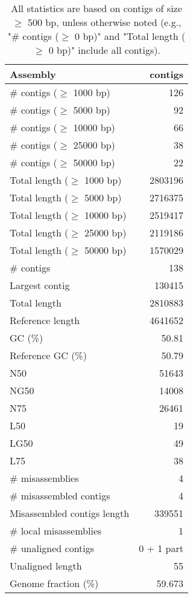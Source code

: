 \documentclass[12pt,a4paper]{article}
\begin{document}
\begin{table}[ht]
\begin{center}
\caption{All statistics are based on contigs of size $\geq$ 500 bp, unless otherwise noted (e.g., "\# contigs ($\geq$ 0 bp)" and "Total length ($\geq$ 0 bp)" include all contigs).}
\begin{tabular}{|l*{1}{|r}|}
\hline
Assembly & contigs \\ \hline
\# contigs ($\geq$ 1000 bp) & 126 \\ \hline
\# contigs ($\geq$ 5000 bp) & 92 \\ \hline
\# contigs ($\geq$ 10000 bp) & 66 \\ \hline
\# contigs ($\geq$ 25000 bp) & 38 \\ \hline
\# contigs ($\geq$ 50000 bp) & 22 \\ \hline
Total length ($\geq$ 1000 bp) & 2803196 \\ \hline
Total length ($\geq$ 5000 bp) & 2716375 \\ \hline
Total length ($\geq$ 10000 bp) & 2519417 \\ \hline
Total length ($\geq$ 25000 bp) & 2119186 \\ \hline
Total length ($\geq$ 50000 bp) & 1570029 \\ \hline
\# contigs & 138 \\ \hline
Largest contig & 130415 \\ \hline
Total length & 2810883 \\ \hline
Reference length & 4641652 \\ \hline
GC (\%) & 50.81 \\ \hline
Reference GC (\%) & 50.79 \\ \hline
N50 & 51643 \\ \hline
NG50 & 14008 \\ \hline
N75 & 26461 \\ \hline
L50 & 19 \\ \hline
LG50 & 49 \\ \hline
L75 & 38 \\ \hline
\# misassemblies & 4 \\ \hline
\# misassembled contigs & 4 \\ \hline
Misassembled contigs length & 339551 \\ \hline
\# local misassemblies & 1 \\ \hline
\# unaligned contigs & 0 + 1 part \\ \hline
Unaligned length & 55 \\ \hline
Genome fraction (\%) & 59.673 \\ \hline

\end{tabular}
\end{center}
\end{table}
\end{document}
